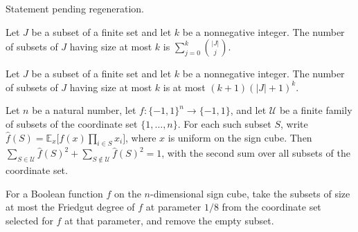 \begin{theorem}
\label{FABL.mem_lowDegreeSubsets}
\leanok
{}
Statement pending regeneration.
\end{theorem}

\begin{theorem}
\label{FABL.card_lowDegreeSubsets_eq_sum_choose}
\leanok
{}
Let $J$ be a subset of a finite set and let $k$ be a nonnegative integer. The number of
subsets of $J$ having size at most $k$ is $\displaystyle\sum_{j=0}^{k}\binom{|J|}{j}$.
\end{theorem}

\begin{theorem}
\label{FABL.card_lowDegreeSubsets_le}
\leanok
{}
Let $J$ be a subset of a finite set and let $k$ be a nonnegative integer. The number of
subsets of $J$ having size at most $k$ is at most $(k+1)(|J|+1)^k$.
\end{theorem}

\begin{theorem}
\label{FABL.sum_fourierWeight_mem_add_outside_eq_one}
\leanok
{}
Let $n$ be a natural number, let $f:\{-1,1\}^n\to\{-1,1\}$, and let $\mathcal U$ be a
finite family of subsets of the coordinate set $\{1,\ldots,n\}$. For each such subset
$S$, write $\widehat f(S)=\mathbb E_x\bigl[f(x)\prod_{i\in S}x_i\bigr]$, where $x$ is
uniform on the sign cube. Then $\sum_{S\in\mathcal U}\widehat
f(S)^2+\sum_{S\notin\mathcal U}\widehat f(S)^2=1$, with the second sum over all subsets
of the coordinate set.
\end{theorem}

\begin{definition}
\label{FABL.corollary9_32Family}
\leanok
{}
For a Boolean function $f$ on the $n$-dimensional sign cube, take the subsets of size at
most the Friedgut degree of $f$ at parameter $1/8$ from the coordinate set selected for
$f$ at that parameter, and remove the empty subset.
\end{definition}

